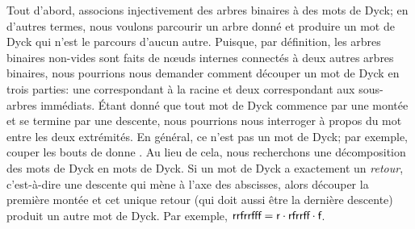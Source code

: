 Tout d'abord, associons injectivement des arbres binaires à des mots
de Dyck; en d'autres termes, nous voulons parcourir un arbre donné et
produire un mot de Dyck qui n'est le parcours d'aucun autre. Puisque,
par définition, les arbres binaires non-vides sont faits de nœuds
internes connectés à deux autres arbres binaires, nous pourrions nous
demander comment découper un mot de Dyck en trois parties: une
correspondant à la racine et deux correspondant aux sous-arbres
immédiats. Étant donné que tout mot de Dyck commence par une montée et
se termine par une descente, nous pourrions nous interroger à propos
du mot entre les deux extrémités. En général, ce n'est pas un mot de
Dyck; par exemple, couper les bouts de  donne
. Au lieu de cela, nous recherchons une décomposition des
mots de Dyck en mots de Dyck. Si un mot de Dyck a exactement un
\emph{retour}, c'est-à-dire une descente qui mène à l'axe des
abscisses, alors découper la première montée et cet unique retour (qui
doit aussi être la dernière descente) produit un autre mot de
Dyck. Par exemple, \(\textsf{rrfrrfff} = \textsf{r} \cdot \textsf{rfrrff} \cdot
\textsf{f}\).

